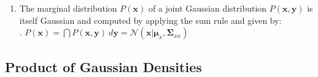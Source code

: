 \begin{enumerate}
\begin{multicols}{2}
\begin{enumerate}
        \item $ \bm{\Sigma}_{x | y} = \bm{\Sigma}_{xx} - \bm{\Sigma}_{xy} \bm{\Sigma}^{-1}_{yy} \bm{\Sigma}_{yx} $
        \hfill \cite{mfml/book/mml/Deisenroth-Faisal-Ong}
    \end{enumerate}
    \end{multicols}
    where $\bm{y}$-value is an observation and no longer random.
    \hfill \cite{mfml/book/mml/Deisenroth-Faisal-Ong}

    \item The marginal distribution $P(\bm{x})$ of a joint Gaussian distribution $P(\bm{x}, \bm{y})$ is itself Gaussian and computed by applying the sum rule and given by:
    \hfill \cite{mfml/book/mml/Deisenroth-Faisal-Ong}
    \\[0.2cm]
    .\hfill
    $
        P(\bm{x}) 
        = \dint P(\bm{x}, \bm{y})\ d\bm{y} 
        = \mathcal{N} (\bm{x} | \bm{\mu}_x, \bm{\Sigma}_{xx})
    $
    \hfill \cite{mfml/book/mml/Deisenroth-Faisal-Ong}
\end{enumerate}








\subsection{Product of Gaussian Densities}

